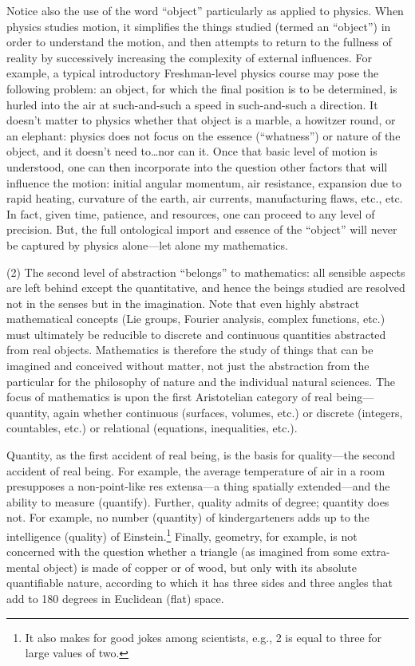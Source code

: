 Notice also the use of the word ``object'' particularly as applied to physics. When physics studies motion, it simplifies the things studied (termed an ``object'') in order to understand the motion, and then attempts to return to the fullness of reality by successively increasing the complexity of external influences. For example, a typical introductory Freshman-level physics course may pose the following problem: an object, for which the final position is to be determined, is hurled into the air at such-and-such a speed in such-and-such a direction. It doesn’t matter to physics whether that object is a marble, a howitzer round, or an elephant: physics does not focus on the essence (``whatness'') or nature of the object, and it doesn’t need to\ldots nor can it. Once that basic level of motion is understood, one can then incorporate into the question other factors that will influence the motion: initial angular momentum, air resistance, expansion due to rapid heating, curvature of the earth, air currents, manufacturing flaws, etc., etc. In fact, given time, patience, and resources, one can proceed to any level of precision. But, the full ontological import and essence of the ``object'' will never be captured by physics alone---let alone my mathematics.

(2) The second level of abstraction ``belongs'' to mathematics: all sensible aspects are left behind except the quantitative, and hence the beings studied are resolved not in the senses but in the imagination. Note that even highly abstract mathematical concepts (Lie groups, Fourier analysis, complex functions, etc.) must ultimately be reducible to discrete and continuous quantities abstracted from real objects. Mathematics is therefore the study of things that can be imagined and conceived without matter, not just the abstraction from the particular for the philosophy of nature and the individual natural sciences. The focus of mathematics is upon the first Aristotelian category of real being---quantity, again whether continuous (surfaces, volumes, etc.) or discrete (integers, countables, etc.) or relational (equations, inequalities, etc.).

Quantity, as the first accident of real being, is the basis for quality---the second accident of real being. For example, the average temperature of air in a room presupposes a non-point-like res extensa---a thing spatially extended---and the ability to measure (quantify). Further, quality admits of degree; quantity does not. For example, no number (quantity) of kindergarteners adds up to the intelligence (quality) of Einstein.\footnote{It also makes for good jokes among scientists, e.g., 2 is equal to three for large values of two.} Finally, geometry, for example, is not concerned with the question whether a triangle (as imagined from some extra-mental object) is made of copper or of wood, but only with its absolute quantifiable nature, according to which it has three sides and three angles that add to 180 degrees in Euclidean (flat) space.

